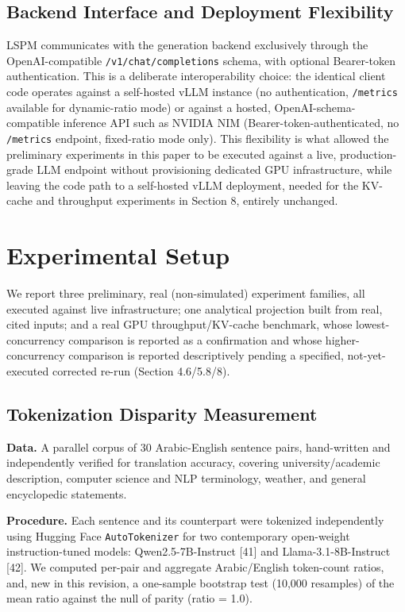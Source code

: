 \subsection{Backend Interface and Deployment Flexibility}
LSPM communicates with the generation backend exclusively through the OpenAI-compatible \texttt{/v1/chat/completions} schema, with optional Bearer-token authentication. This is a deliberate interoperability choice: the identical client code operates against a self-hosted vLLM instance (no authentication, \texttt{/metrics} available for dynamic-ratio mode) or against a hosted, OpenAI-schema-compatible inference API such as NVIDIA NIM (Bearer-token-authenticated, no \texttt{/metrics} endpoint, fixed-ratio mode only). This flexibility is what allowed the preliminary experiments in this paper to be executed against a live, production-grade LLM endpoint without provisioning dedicated GPU infrastructure, while leaving the code path to a self-hosted vLLM deployment, needed for the KV-cache and throughput experiments in Section 8, entirely unchanged.

\section{Experimental Setup}
We report three preliminary, real (non-simulated) experiment families, all executed against live infrastructure; one analytical projection built from real, cited inputs; and a real GPU throughput/KV-cache benchmark, whose lowest-concurrency comparison is reported as a confirmation and whose higher-concurrency comparison is reported descriptively pending a specified, not-yet-executed corrected re-run (Section 4.6/5.8/8).

\subsection{Tokenization Disparity Measurement}
\textbf{Data.} A parallel corpus of 30 Arabic-English sentence pairs, hand-written and independently verified for translation accuracy, covering university/academic description, computer science and NLP terminology, weather, and general encyclopedic statements.

\textbf{Procedure.} Each sentence and its counterpart were tokenized independently using Hugging Face \texttt{AutoTokenizer} for two contemporary open-weight instruction-tuned models: Qwen2.5-7B-Instruct [41] and Llama-3.1-8B-Instruct [42]. We computed per-pair and aggregate Arabic/English token-count ratios, and, new in this revision, a one-sample bootstrap test (10,000 resamples) of the mean ratio against the null of parity (ratio = 1.0).

